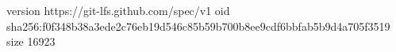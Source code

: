 version https://git-lfs.github.com/spec/v1
oid sha256:f0f348b38a3ede2c76eb19d546c85b59b700b8ee9cdf6bbfab5b9d4a705f3519
size 16923
